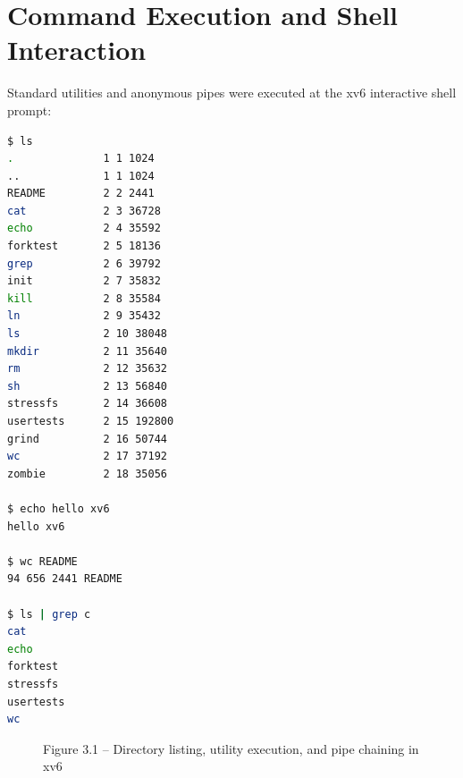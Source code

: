 \documentclass[12pt,a4paper]{report}
\numberwithin{equation}{chapter}
\numberwithin{figure}{chapter}
\numberwithin{table}{chapter}
\begin{document}
\section{Command Execution and Shell Interaction}
Standard utilities and anonymous pipes were executed at the xv6 interactive shell prompt:

\begin{lstlisting}[language=bash]
$ ls
.              1 1 1024
..             1 1 1024
README         2 2 2441
cat            2 3 36728
echo           2 4 35592
forktest       2 5 18136
grep           2 6 39792
init           2 7 35832
kill           2 8 35584
ln             2 9 35432
ls             2 10 38048
mkdir          2 11 35640
rm             2 12 35632
sh             2 13 56840
stressfs       2 14 36608
usertests      2 15 192800
grind          2 16 50744
wc             2 17 37192
zombie         2 18 35056

$ echo hello xv6
hello xv6

$ wc README
94 656 2441 README

$ ls | grep c
cat
echo
forktest
stressfs
usertests
wc
\end{lstlisting}

\begin{figure}[H]
\centering
\caption{Figure 3.1 -- Directory listing, utility execution, and pipe chaining in xv6}
\end{figure}
\end{document}

